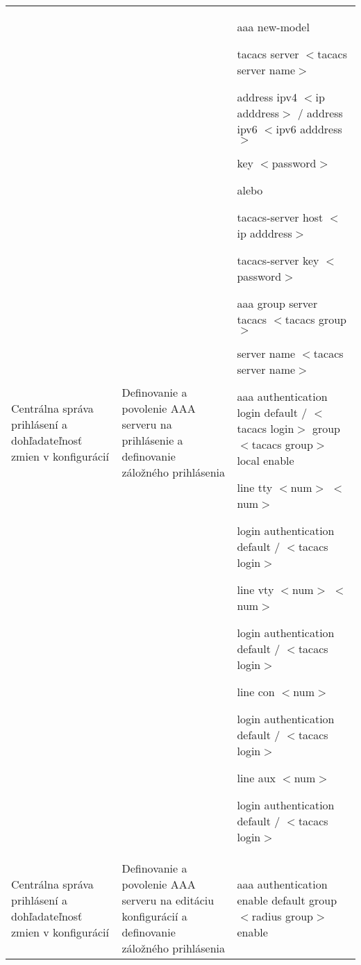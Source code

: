 \begin{longtable}[!htbp]{|L{10em}L{10em}>{\selectfont}L{34em}|}
	
	
	
	 Centrálna správa prihlásení a dohľadateľnosť zmien v konfigurácií	&Definovanie a povolenie AAA serveru na prihlásenie a definovanie záložného prihlásenia	&aaa new-model
	
	tacacs server $<$tacacs server name$>$
	
	\hspace{0.5em}address ipv4 $<$ip adddress$>$ / address ipv6 $<$ipv6 adddress$>$
	
	\hspace{0.5em}key $<$password$>$
	\vspace{0.5em}
	
	{\selectfont alebo}
	
	\vspace{0.5em}
	tacacs-server host $<$ip adddress$>$
	
	tacacs-server key $<$password$>$
	
	\vspace{0.5em}
	
	aaa group server tacacs $<$tacacs group$>$
	
	\hspace{0.5em}server name $<$tacacs server name$>$
	
	aaa authentication login default / $<$tacacs login$>$ group $<$tacacs group$>$ local enable
	
	line tty $<$num$>$ $<$num$>$
	
	\hspace{0.5em}login authentication default / $<$tacacs login$>$
	
	line vty $<$num$>$ $<$num$>$
	
	\hspace{0.5em}login authentication default / $<$tacacs login$>$
	
	line con $<$num$>$
	
	\hspace{0.5em}login authentication default / $<$tacacs login$>$
	
	line aux $<$num$>$
	
	
	\hspace{0.5em}login authentication default / $<$tacacs login$>$\\
	
	
	
	
	Centrálna správa prihlásení a dohľadateľnosť zmien v konfigurácií	&Definovanie a povolenie AAA serveru na editáciu konfigurácií a definovanie záložného prihlásenia	&aaa authentication enable default group $<$radius group$>$ enable\\
	

\end{longtable}
